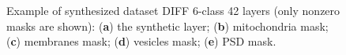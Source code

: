 \documentclass[journal,article,submit,pdftex,moreauthors]{Definitions/mdpi}
\begin{document}
\begin{figure}[H]
	\hspace{0.1cm}
	\hspace{0.1cm}
	\hspace{0.1cm}
	\hspace{0.1cm}
	\hspace{0.1cm}
	\caption{Example of synthesized dataset DIFF 6-class 42 layers (only nonzero masks are shown): (\textbf{a}) the synthetic layer; (\textbf{b}) mitochondria mask; (\textbf{c}) membranes mask; (\textbf{d}) vesicles mask; (\textbf{e}) PSD mask.\label{fig10}}
\end{figure}
\end{document}
